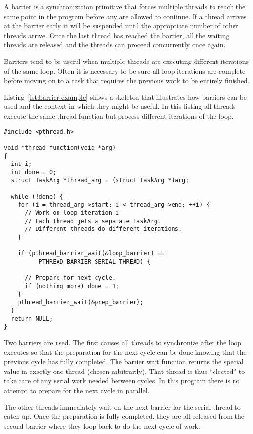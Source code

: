 A barrier is a synchronization primitive that forces multiple threads to reach the same point in
the program before any are allowed to continue. If a thread arrives at the barrier early it will
be suspended until the appropriate number of other threads arrive. Once the last thread has
reached the barrier, all the waiting threads are released and the threads can proceed
concurrently once again.

Barriers tend to be useful when multiple threads are executing different iterations of the same
loop. Often it is necessary to be sure all loop iterations are complete before moving on to a
task that requires the previous work to be entirely finished.

Listing~\ref{lst:barrier-example} shows a skeleton that illustrates how barriers can be used and
the context in which they might be useful. In this listing all threads execute the same thread
function but process different iterations of the  loop.

\begin{lstlisting}[float=tp,frame=single,xleftmargin=0in, caption={Barrier
Example},label=lst:barrier-example]
#include <pthread.h>

void *thread_function(void *arg)
{
  int i;
  int done = 0;
  struct TaskArg *thread_arg = (struct TaskArg *)arg;

  while (!done) {
    for (i = thread_arg->start; i < thread_arg->end; ++i) {
      // Work on loop iteration i
      // Each thread gets a separate TaskArg.
      // Different threads do different iterations.
    }

    if (pthread_barrier_wait(&loop_barrier) ==
          PTHREAD_BARRIER_SERIAL_THREAD) {

      // Prepare for next cycle.
      if (nothing_more) done = 1;
    }
    pthread_barrier_wait(&prep_barrier);
  }
  return NULL;
}
\end{lstlisting}

Two barriers are used. The first causes all threads to synchronize after the  loop
executes so that the preparation for the next cycle can be done knowing that the previous cycle
has fully completed. The barrier wait function returns the special value
 in exactly one thread (chosen arbitrarily).
That thread is thus ``elected'' to take care of any serial work needed between cycles. In this
program there is no attempt to prepare for the next cycle in parallel.

The other threads immediately wait on the next barrier for the serial thread to catch up. Once
the preparation is fully completed, they are all released from the second barrier where they
loop back to do the next cycle of work.

